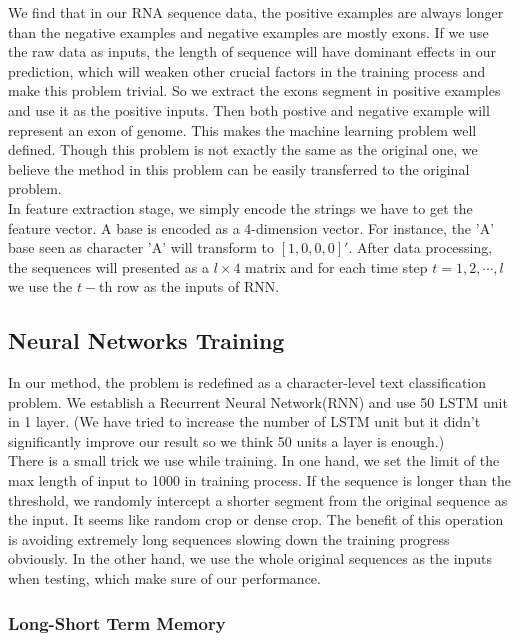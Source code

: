 \documentclass[paper=a4, fontsize=11pt] {scrartcl} %
\numberwithin{equation}{section} %
\numberwithin{figure}{section} %
\numberwithin{table}{section} %
\begin{document}
We find that in our RNA sequence data, the positive examples are always longer than the negative examples and negative examples are mostly exons. If we use the raw data as inputs, the length of sequence will have dominant effects in our prediction, which will weaken other crucial factors in the training process and make this problem trivial. So we extract the exons segment in positive examples and use it as the positive inputs. Then both postive and negative example will represent an exon of genome. This makes the machine learning problem well defined. Though this problem is not exactly the same as the original one, we believe the method in this problem can be easily transferred to the original problem. \\

In feature extraction stage, we simply encode the strings we have to get the feature vector. A base is encoded as a 4-dimension vector. For instance, the 'A' base seen as character 'A' will transform to $[1,0,0,0]'$. After data processing, the sequences will presented as a $l\times 4$ matrix and for each time step $t=1,2,\cdots,l$ we use the $t-$th row as the inputs of RNN.\\

\subsection{Neural Networks Training}

In our method, the problem is redefined as a character-level text classification problem. We establish a Recurrent Neural Network(RNN) and use 50 LSTM unit in 1 layer. (We have tried to increase the number of LSTM unit but it didn't significantly improve our result so we think 50 units a layer is enough.) \\

There is a small trick we use while training. In one hand, we set the limit of the max length of input to 1000 in training process. If the sequence is longer than the threshold, we randomly intercept a shorter segment from the original sequence as the input. It seems like random crop or dense crop. The benefit of this operation is avoiding extremely long sequences slowing down the training progress obviously. In the other hand, we use the whole original sequences as the inputs when testing, which 
make sure of our performance.

\subsubsection{Long-Short Term Memory}
\end{document}
